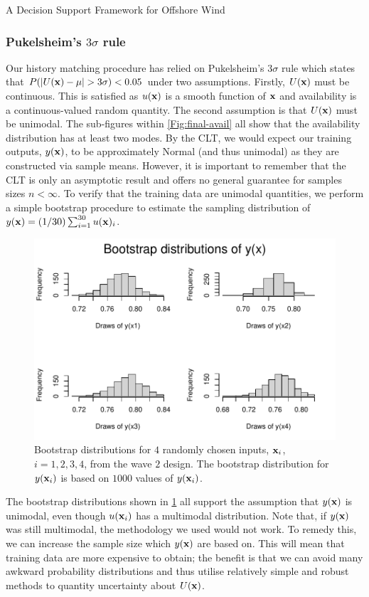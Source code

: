 \begin{chapter}{A Decision Support Framework for Offshore Wind \label{Ch:ds-for-ow}}
\subsubsection{Pukelsheim's $3\sigma$ rule}
Our history matching procedure has relied on Pukelsheim's 3$\sigma$ rule which states that $P(|U(\mathbf{x}) - \mu| > 3\sigma) < 0.05$ under two assumptions. Firstly, $U(\mathbf{x})$ must be continuous. This is satisfied as $u(\mathbf{x})$ is a smooth function of $\mathbf{x}$ and availability is a continuous-valued random quantity. The second assumption is that $U(\mathbf{x})$ must be unimodal. The sub-figures within \cref{Fig:final-avail} all show that the availability distribution has at least two modes. By the CLT, we would expect our training outputs, $y(\mathbf{x})$, to be approximately Normal (and thus unimodal) as they are constructed via sample means. However, it is important to remember that the CLT is only an asymptotic result and offers no general guarantee for samples sizes $n < \infty$. To verify that the training data are unimodal quantities, we perform a simple bootstrap procedure to estimate the sampling distribution of $y(\mathbf{x}) = (1/30) \sum_{i=1}^{30} u(\mathbf{x})_i$.
\begin{figure}
 \centering
 \includegraphics{fig-ds/bootstrap.pdf}
 \caption{Bootstrap distributions for $4$ randomly chosen inputs, $\mathbf{x}_i$, $i = 1, 2, 3, 4$, from the wave $2$ design. The bootstrap distribution for $y(\mathbf{x}_i)$ is based on $1000$ values of $y(\mathbf{x}_i)$. \label{Fig:bootstrap}}
\end{figure}
The bootstrap distributions shown in \cref{Fig:bootstrap} all support the assumption that $y(\mathbf{x})$ is unimodal, even though $u(\mathbf{x}_i)$ has a multimodal distribution. Note that, if $y(\mathbf{x})$ was still multimodal, the methodology we used would not work. To remedy this, we can increase the sample size which $y(\mathbf{x})$ are based on. This will mean that training data are more expensive to obtain; the benefit is that we can avoid many awkward probability distributions and thus utilise relatively simple and robust methods to quantity uncertainty about $U(\mathbf{x})$.

\end{chapter}
